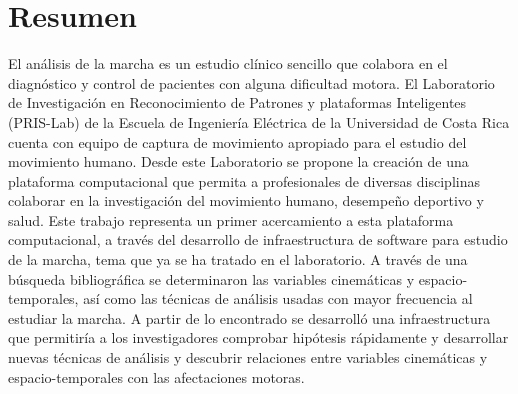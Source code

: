 \chapter{Resumen}

El análisis de la marcha es un estudio clínico sencillo que colabora en el diagnóstico y control de pacientes con alguna dificultad motora. El Laboratorio de Investigación en Reconocimiento de Patrones y plataformas Inteligentes (PRIS-Lab) de la Escuela de Ingeniería Eléctrica de la Universidad de Costa Rica cuenta con equipo de captura de movimiento apropiado para el estudio del movimiento humano. Desde este Laboratorio se propone la creación de una plataforma computacional que permita a profesionales de diversas disciplinas colaborar en la investigación del movimiento humano, desempeño deportivo y salud. Este trabajo representa un primer acercamiento a esta plataforma computacional, a través del desarrollo de infraestructura de software para estudio de la marcha, tema que ya se ha tratado en el laboratorio. A través de una búsqueda bibliográfica se determinaron las variables cinemáticas y espacio-temporales, así como las técnicas de análisis usadas con mayor frecuencia al estudiar la marcha. A partir de lo encontrado se desarrolló una infraestructura que permitiría a los investigadores comprobar hipótesis rápidamente y desarrollar nuevas técnicas de análisis y descubrir relaciones entre variables cinemáticas y espacio-temporales con las afectaciones motoras. 
